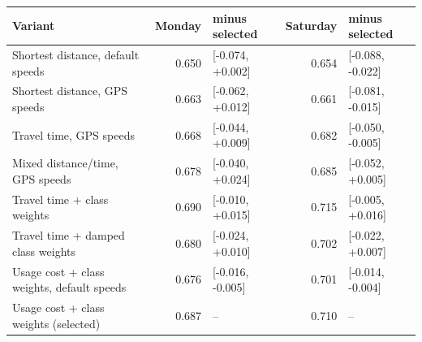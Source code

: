 \begin{tabular}{@{}lrlrl@{}}\toprule
Variant & Monday & minus selected & Saturday & minus selected \\\midrule
Shortest distance, default speeds & 0.650 & [-0.074, +0.002] & 0.654 & [-0.088, -0.022] \\
Shortest distance, GPS speeds & 0.663 & [-0.062, +0.012] & 0.661 & [-0.081, -0.015] \\
Travel time, GPS speeds & 0.668 & [-0.044, +0.009] & 0.682 & [-0.050, -0.005] \\
Mixed distance/time, GPS speeds & 0.678 & [-0.040, +0.024] & 0.685 & [-0.052, +0.005] \\
Travel time + class weights & 0.690 & [-0.010, +0.015] & 0.715 & [-0.005, +0.016] \\
Travel time + damped class weights & 0.680 & [-0.024, +0.010] & 0.702 & [-0.022, +0.007] \\
Usage cost + class weights, default speeds & 0.676 & [-0.016, -0.005] & 0.701 & [-0.014, -0.004] \\
Usage cost + class weights (selected) & 0.687 & -- & 0.710 & -- \\
\bottomrule\end{tabular}
